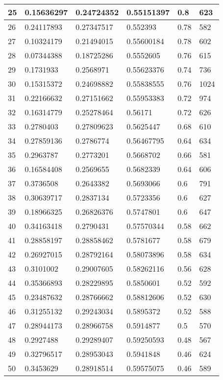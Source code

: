 \begin{longtable}{|l|l|l|l|l|l|}
25 & 0.15636297 & 0.24724352 & 0.55151397 & 0.8 & 623 \\ \hline 
26 & 0.24117893 & 0.27347517 & 0.552393 & 0.78 & 582 \\ \hline 
27 & 0.10324179 & 0.21494015 & 0.55600184 & 0.78 & 602 \\ \hline 
28 & 0.07344388 & 0.18725286 & 0.5552605 & 0.76 & 615 \\ \hline 
29 & 0.1731933 & 0.2568971 & 0.55623376 & 0.74 & 736 \\ \hline 
30 & 0.15315372 & 0.24698882 & 0.55838555 & 0.76 & 1024 \\ \hline 
31 & 0.22166632 & 0.27151662 & 0.55953383 & 0.72 & 974 \\ \hline 
32 & 0.16314779 & 0.25278464 & 0.56171 & 0.72 & 626 \\ \hline 
33 & 0.2780403 & 0.27809623 & 0.5625447 & 0.68 & 610 \\ \hline 
34 & 0.27859136 & 0.2786774 & 0.56467795 & 0.64 & 634 \\ \hline 
35 & 0.2963787 & 0.2773201 & 0.5668702 & 0.66 & 581 \\ \hline 
36 & 0.16584408 & 0.2569655 & 0.5682339 & 0.64 & 606 \\ \hline 
37 & 0.3736508 & 0.2643382 & 0.5693066 & 0.6 & 791 \\ \hline 
38 & 0.30639717 & 0.2837134 & 0.5723356 & 0.6 & 627 \\ \hline 
39 & 0.18966325 & 0.26826376 & 0.5747801 & 0.6 & 647 \\ \hline 
40 & 0.34163418 & 0.2790431 & 0.57570344 & 0.58 & 662 \\ \hline 
41 & 0.28858197 & 0.28858462 & 0.5781677 & 0.58 & 679 \\ \hline 
42 & 0.26927015 & 0.28792164 & 0.58073896 & 0.58 & 634 \\ \hline 
43 & 0.3101002 & 0.29007605 & 0.58262116 & 0.56 & 628 \\ \hline 
44 & 0.35366893 & 0.28229895 & 0.5850601 & 0.52 & 592 \\ \hline 
45 & 0.23487632 & 0.28766662 & 0.58812606 & 0.52 & 630 \\ \hline 
46 & 0.31255132 & 0.29243034 & 0.5895372 & 0.52 & 588 \\ \hline 
47 & 0.28944173 & 0.28966758 & 0.5914877 & 0.5 & 570 \\ \hline 
48 & 0.2927488 & 0.29289407 & 0.59250593 & 0.48 & 567 \\ \hline 
49 & 0.32796517 & 0.28953043 & 0.5941848 & 0.46 & 624 \\ \hline 
50 & 0.3453629 & 0.28918514 & 0.59575075 & 0.46 & 589 \\ \hline 
\end{longtable}